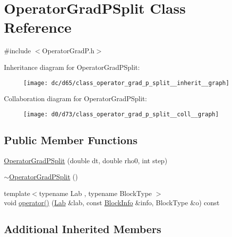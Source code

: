 \hypertarget{class_operator_grad_p_split}{}\section{Operator\+Grad\+P\+Split Class Reference}
\label{class_operator_grad_p_split}


{\ttfamily \#include $<$Operator\+Grad\+P.\+h$>$}



Inheritance diagram for Operator\+Grad\+P\+Split\+:\nopagebreak
\begin{figure}[H]
\begin{center}
\leavevmode
\texttt{[image: dc/d65/class\_operator\_grad\_p\_split\_\_inherit\_\_graph]}
\end{center}
\end{figure}


Collaboration diagram for Operator\+Grad\+P\+Split\+:\nopagebreak
\begin{figure}[H]
\begin{center}
\leavevmode
\texttt{[image: d0/d73/class\_operator\_grad\_p\_split\_\_coll\_\_graph]}
\end{center}
\end{figure}
\subsection*{Public Member Functions}
\begin{DoxyCompactItemize}
\item 
\hyperlink{class_operator_grad_p_split_a8da51bf59061b4f94510f6023be4670b}{Operator\+Grad\+P\+Split} (double dt, double rho0, int step)
\item 
\hyperlink{class_operator_grad_p_split_a746617dce0ec1f07252ae018bfe57adf}{$\sim$\+Operator\+Grad\+P\+Split} ()
\item 
{\footnotesize template$<$typename Lab , typename Block\+Type $>$ }\\void \hyperlink{class_operator_grad_p_split_ad93e7297f5476603c6f86f0c6fcfefac}{operator()} (\hyperlink{_definitions_8h_ae720d9054713370bbf4c86860e4dde70}{Lab} \&lab, const \hyperlink{struct_block_info}{Block\+Info} \&info, Block\+Type \&o) const 
\end{DoxyCompactItemize}
\subsection*{Additional Inherited Members}


